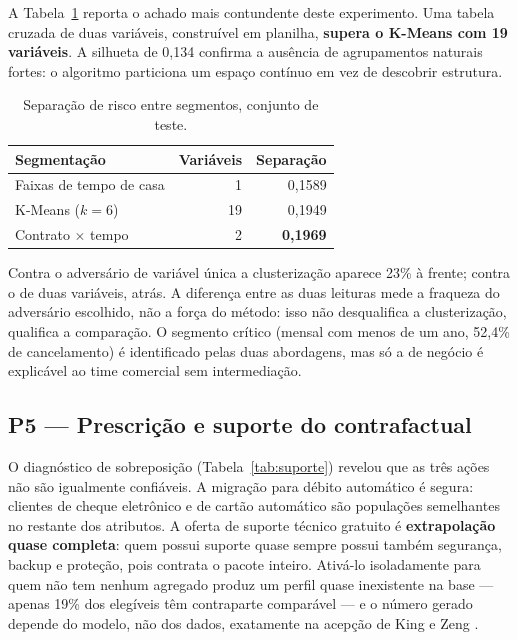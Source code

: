 \documentclass[10pt,a4paper]{article}
\begin{document}
A Tabela~\ref{tab:segmentacao} reporta o achado mais contundente deste experimento. Uma tabela
cruzada de duas variáveis, construível em planilha, \textbf{supera o K-Means com 19
variáveis}. A silhueta de 0,134 confirma a ausência de agrupamentos naturais fortes: o
algoritmo particiona um espaço contínuo em vez de descobrir estrutura.

\begin{table}[t]
\centering
\small
\caption{Separação de risco entre segmentos, conjunto de teste.}
\label{tab:segmentacao}
\begin{tabular}{@{}lrr@{}}
\toprule
\textbf{Segmentação} & \textbf{Variáveis} & \textbf{Separação} \\
\midrule
Faixas de tempo de casa      & 1  & 0,1589 \\
K-Means (\(k=6\))            & 19 & 0,1949 \\
Contrato \(\times\) tempo    & 2  & \textbf{0,1969} \\
\bottomrule
\end{tabular}
\end{table}

Contra o adversário de variável única a clusterização aparece 23\% à frente; contra o de duas
variáveis, atrás. A diferença entre as duas leituras mede a fraqueza do adversário escolhido,
não a força do método: isso não desqualifica a clusterização, qualifica a comparação. O segmento
crítico (mensal com menos de um ano, 52,4\% de cancelamento) é identificado pelas duas
abordagens, mas só a de negócio é explicável ao time comercial sem intermediação.

\subsection{P5 --- Prescrição e suporte do contrafactual}

O diagnóstico de sobreposição (Tabela~\ref{tab:suporte}) revelou que as três ações não são
igualmente confiáveis. A migração para débito automático é segura: clientes de cheque eletrônico
e de cartão automático são populações semelhantes no restante dos atributos. A oferta de suporte
técnico gratuito é \textbf{extrapolação quase completa}: quem possui suporte quase sempre possui
também segurança, backup e proteção, pois contrata o pacote inteiro. Ativá-lo isoladamente para
quem não tem nenhum agregado produz um perfil quase inexistente na base --- apenas 19\% dos
elegíveis têm contraparte comparável --- e o número gerado depende do modelo, não dos dados,
exatamente na acepção de King e Zeng \cite{king}.
\end{document}
